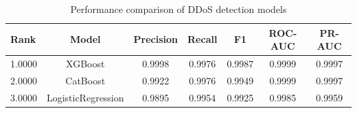 \begin{table}
\caption{Performance comparison of DDoS detection models}
\label{tab:model_comparison}
\begin{tabular}{lcccccc}
\midrule
Rank & Model & Precision & Recall & F1 & ROC-AUC & PR-AUC \\
\midrule
1.0000 & XGBoost & 0.9998 & 0.9976 & 0.9987 & 0.9999 & 0.9997 \\
2.0000 & CatBoost & 0.9922 & 0.9976 & 0.9949 & 0.9999 & 0.9997 \\
3.0000 & LogisticRegression & 0.9895 & 0.9954 & 0.9925 & 0.9985 & 0.9959 \\
\bottomrule
\end{tabular}
\end{table}
